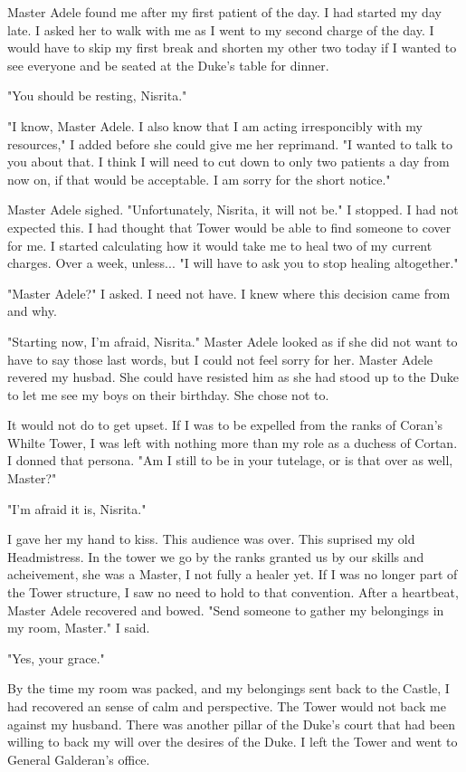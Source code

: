 \documentclass{article}
\begin{document}
Master Adele found me after my first patient of the day. I had started my day late. I asked her to walk with me as I went to my second charge of the day. I would have to skip my first break and shorten my other two today if I wanted to see everyone and be seated at the Duke's table for dinner. 

"You should be resting, Nisrita." 

"I know, Master Adele. I also know that I am acting irresponcibly with my resources," I added before she could give me her reprimand. "I wanted to talk to you about that. I think I will need to cut down to only two patients a day from now on, if that would be acceptable. I am sorry for the short notice."

Master Adele sighed. "Unfortunately, Nisrita, it will not be." I stopped. I had not expected this. I had thought that Tower would be able to find someone to cover for me. I started calculating how it would take me to heal two of my current charges. Over a week, unless... "I will have to ask you to stop healing altogether."

"Master Adele?" I asked. I need not have. I knew where this decision came from and why. 

"Starting now, I'm afraid, Nisrita." Master Adele looked as if she did not want to have to say those last words, but I could not feel sorry for her. Master Adele revered my husbad. She could have resisted him as she had stood up to the Duke to let me see my boys on their birthday. She chose not to. 

It would not do to get upset. If I was to be expelled from the ranks of Coran's Whilte Tower, I was left with nothing more than my role as a duchess of Cortan. I donned that persona. "Am I still to be in your tutelage, or is that over as well, Master?"

"I'm afraid it is, Nisrita." 

I gave her my hand to kiss. This audience was over. This suprised my old Headmistress. In the tower we go by the ranks granted us by our skills and acheivement, she was a Master, I not fully a healer yet. If I was no longer part of the Tower structure, I saw no need to hold to that convention. After a heartbeat, Master Adele recovered and bowed. "Send someone to gather my belongings in my room, Master." I said.

"Yes, your grace." 

By the time my room was packed, and my belongings sent back to the Castle, I had recovered an sense of calm and perspective. The Tower would not back me against my husband. There was another pillar of the Duke's court that had been willing to back my will over the desires of the Duke. I left the Tower and went to General Galderan's office.
\end{document}
